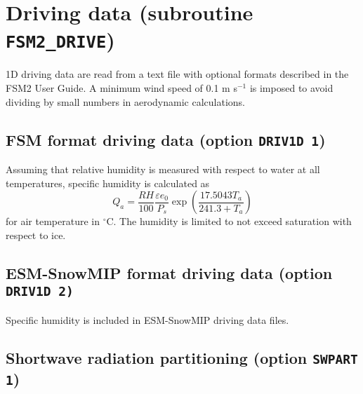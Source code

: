 \documentclass[fleqn]{article}
\begin{document}
\section{Driving data (subroutine {\tt FSM2\_DRIVE})}

1D driving data are read from a text file with optional formats described in the FSM2 User Guide. A minimum wind speed of 0.1 m s$^{-1}$ is imposed to avoid dividing by small numbers in aerodynamic calculations.

\subsection{FSM format driving data (option {\tt DRIV1D 1})}

Assuming that relative humidity is measured with respect to water at all temperatures, specific humidity is calculated as
\begin{equation}
Q_a = \frac{RH}{100}\frac{\varepsilon e_0}{P_s}\exp\left(\frac{17.5043T_a}{241.3 + T_a}\right)
\end{equation}
for air temperature in $^\circ$C. The humidity is limited to not exceed saturation with respect to ice.

\subsection{ESM-SnowMIP format driving data (option {\tt DRIV1D 2)}}

Specific humidity is included in ESM-SnowMIP driving data files.


\subsection{Shortwave radiation partitioning (option {\tt SWPART 1})}
\end{document}
